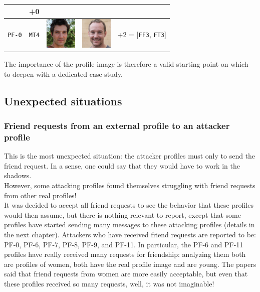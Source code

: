 \begin{center}
\begin{tabular}[c]{ |c|c|m{1.5cm}|m{1.5cm}|c| }
	& +0 \\	 
	\hline
	\cellcolor[HTML]{b0d7ff}\texttt{PF-0}
	&\cellcolor[HTML]{e6f2ff}\texttt{MT4}
	&\vspace{.15cm}	\includegraphics[height=1.5cm]{immagini/MT4.jpg}
	&\vspace{.15cm}	\includegraphics[height=1.5cm]{immagini/MT4-new.jpg}
	&+2 = [\texttt{FF3}, \texttt{FT3}]\\
	\hline 	 	 	 	 	
\end{tabular}
	
\end{center}
The importance of the profile image is therefore a valid starting point on which to deepen with a dedicated case study.
\subsection{Unexpected situations}
\subsubsection*{Friend requests from an external profile to an attacker profile}
This is the most unexpected situation: the attacker profiles must only to send the friend request. In a sense, one could say that they would have to work in the shadows.\\However, some attacking profiles found themselves struggling with friend requests from other real profiles!\\It was decided to accept all friend requests to see the behavior that these profiles would then assume, but there is nothing relevant to report, except that some profiles have started sending many messages to these attacking profiles (details in the next chapter). Attackers who have received friend requests are reported to be: PF-0, PF-6, PF-7, PF-8, PF-9, and PF-11. In particular, the PF-6 and PF-11 profiles have really received many requests for friendship: analyzing them both are profiles of women, both have the real profile image and are young. The papers said that friend requests from women are more easily acceptable, but even that these profiles received so many requests, well, it was not imaginable!
